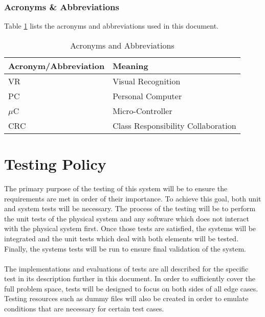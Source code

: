 \documentclass[titlepage]{article}
\begin{document}
\subsubsection{Acronyms \& Abbreviations}
Table \ref{tab:Acronyms} lists the acronyms and abbreviations used in this document.
\begin{table}[h!]
\centering
\begin{tabular}{| p{6cm} | p{6cm} |}\hline
	\textbf{Acronym/Abbreviation}	&\textbf{Meaning}\\\hline
	VR								&Visual Recognition\\\hline
	PC								&Personal Computer\\\hline
	$\mu$C							&Micro-Controller\\\hline
	CRC								&Class Responsibility Collaboration\\\hline
\end{tabular}
\caption{Acronyms and Abbreviations}
\label{tab:Acronyms}
\end{table}
\newpage



\section{Testing Policy}
The primary purpose of the testing of this system will be to ensure the requirements are met in order of their importance. To achieve this goal, both unit and system tests will be necessary. The process of the testing will be to perform the unit tests of the physical system and any software which does not interact with the physical system first. Once those tests are satisfied, the systems will be integrated and the unit tests which deal with both elements will be tested. Finally, the systems tests will be run to ensure final validation of the system.\\~\\
The implementations and evaluations of tests are all described for the specific test in its description further in this document. In order to sufficiently cover the full problem space, tests will be designed to focus on both sides of all edge cases. Testing resources such as dummy files will also be created in order to emulate conditions that are necessary for certain test cases.
\end{document}
